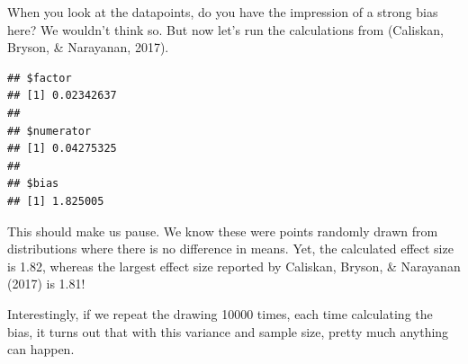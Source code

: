 \documentclass[
  10pt,
  dvipsnames,enabledeprecatedfontcommands]{scrartcl}
\newenvironment{Shaded}{\begin{snugshade}}{\end{snugshade}}
\newcommand{\AttributeTok}[1]{\textcolor[rgb]{0.77,0.63,0.00}{#1}}
\newcommand{\ControlFlowTok}[1]{\textcolor[rgb]{0.13,0.29,0.53}{\textbf{#1}}}
\newcommand{\FunctionTok}[1]{\textcolor[rgb]{0.00,0.00,0.00}{#1}}
\newcommand{\NormalTok}[1]{#1}
\newcommand{\OtherTok}[1]{\textcolor[rgb]{0.56,0.35,0.01}{#1}}
\newcommand{\SpecialCharTok}[1]{\textcolor[rgb]{0.00,0.00,0.00}{#1}}
\begin{document}
\noindent When you look at the datapoints, do you have the impression of
a strong bias here? We wouldn't think so. But now let's run the
calculations from (Caliskan, Bryson, \& Narayanan, 2017).

\vspace{1mm}
\footnotesize

\begin{Shaded}
\end{Shaded}

\begin{verbatim}
## $factor
## [1] 0.02342637
## 
## $numerator
## [1] 0.04275325
## 
## $bias
## [1] 1.825005
\end{verbatim}

\normalsize

\noindent This should make us pause. We know these were points randomly
drawn from distributions where there is no difference in means. Yet, the
calculated effect size is 1.82, whereas the largest effect size reported
by Caliskan, Bryson, \& Narayanan (2017) is 1.81!

Interestingly, if we repeat the drawing 10000 times, each time
calculating the bias, it turns out that with this variance and sample
size, pretty much anything can happen.

\vspace{1mm}
\footnotesize
\end{document}
